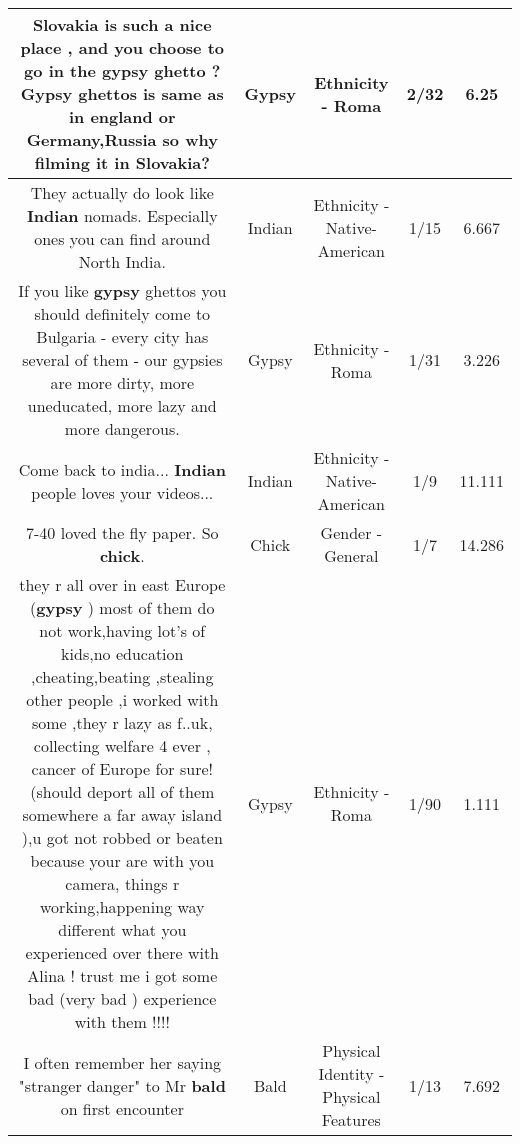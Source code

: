 \documentclass[11pt]{article}
\newlength\mylength
\begin{document}
\begin{center}
\begin{longtable}{|C{.65\mylength}|C{.30\mylength}|C{.12\mylength}|C{.12\mylength}|C{.12\mylength}|}
  \small Slovakia is such a nice place , and you choose to go in the \textbf{gypsy} ghetto ? \textbf{Gypsy} ghettos is same as in england or Germany,Russia so why filming it in Slovakia?\normalsize   & Gypsy & Ethnicity - Roma & 2/32 & 6.25 \\  \hline
  \small They actually do look like \textbf{Indian} nomads. Especially ones you can find around North India.\normalsize   & Indian & Ethnicity - Native-American & 1/15 & 6.667 \\  \hline
  \small If you like \textbf{gypsy} ghettos you should definitely come to Bulgaria - every city has several of them - our gypsies are more dirty, more uneducated, more lazy and more dangerous.\normalsize   & Gypsy & Ethnicity - Roma & 1/31 & 3.226 \\  \hline
  \small Come back to india... \textbf{Indian} people loves your videos...\normalsize   & Indian & Ethnicity - Native-American & 1/9 & 11.111 \\  \hline
  \small 7-40 loved the fly paper. So \textbf{chick}.\normalsize   & Chick & Gender - General & 1/7 & 14.286 \\  \hline
  \small they r all over in east Europe (\textbf{gypsy} ) most of them do not work,having lot's of kids,no education ,cheating,beating ,stealing other people  ,i worked with some ,they r lazy as f..uk, collecting welfare 4 ever ,  cancer of Europe for sure!  (should deport all of  them somewhere a  far away island ),u got not robbed or beaten because your are with you camera, things   r working,happening way different what you experienced over there with Alina ! trust me i got some bad (very bad ) experience with them !!!!\normalsize   & Gypsy & Ethnicity - Roma & 1/90 & 1.111 \\  \hline
  \small I often remember her saying "stranger danger" to Mr \textbf{bald} on first encounter\normalsize   & Bald & Physical Identity - Physical Features & 1/13 & 7.692 \\  \hline

\end{longtable}
\end{center}
\end{document}
